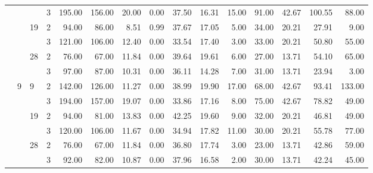 \begin{tabular}{llllrrrrrrrrrrr}
               &   &    & 3 &   195.00 &    156.00 & 20.00 &    0.00 &   37.50 &   16.31 &   15.00 &   91.00 &   42.67 & 100.55 &    88.00 \\
\cline{3-15}
               &   & \multirow{2}{*}{19} & 2 &    94.00 &     86.00 &  8.51 &    0.99 &   37.67 &   17.05 &    5.00 &   34.00 &   20.21 &  27.91 &     9.00 \\
               &   &    & 3 &   121.00 &    106.00 & 12.40 &    0.00 &   33.54 &   17.40 &    3.00 &   33.00 &   20.21 &  50.80 &    55.00 \\
\cline{3-15}
               &   & \multirow{2}{*}{28} & 2 &    76.00 &     67.00 & 11.84 &    0.00 &   39.64 &   19.61 &    6.00 &   27.00 &   13.71 &  54.10 &    65.00 \\
               &   &    & 3 &    97.00 &     87.00 & 10.31 &    0.00 &   36.11 &   14.28 &    7.00 &   31.00 &   13.71 &  23.94 &     3.00 \\
\cline{2-15}
\cline{3-15}
               & \multirow{6}{*}{9} & \multirow{2}{*}{9} & 2 &   142.00 &    126.00 & 11.27 &    0.00 &   38.99 &   19.90 &   17.00 &   68.00 &   42.67 &  93.41 &   133.00 \\
               &   &    & 3 &   194.00 &    157.00 & 19.07 &    0.00 &   33.86 &   17.16 &    8.00 &   75.00 &   42.67 &  78.82 &    49.00 \\
\cline{3-15}
               &   & \multirow{2}{*}{19} & 2 &    94.00 &     81.00 & 13.83 &    0.00 &   42.25 &   19.60 &    9.00 &   32.00 &   20.21 &  46.81 &    49.00 \\
               &   &    & 3 &   120.00 &    106.00 & 11.67 &    0.00 &   34.94 &   17.82 &   11.00 &   30.00 &   20.21 &  55.78 &    77.00 \\
\cline{3-15}
               &   & \multirow{2}{*}{28} & 2 &    76.00 &     67.00 & 11.84 &    0.00 &   36.80 &   17.74 &    3.00 &   23.00 &   13.71 &  42.86 &    59.00 \\
               &   &    & 3 &    92.00 &     82.00 & 10.87 &    0.00 &   37.96 &   16.58 &    2.00 &   30.00 &   13.71 &  42.24 &    45.00 \\
\bottomrule
\end{tabular}
